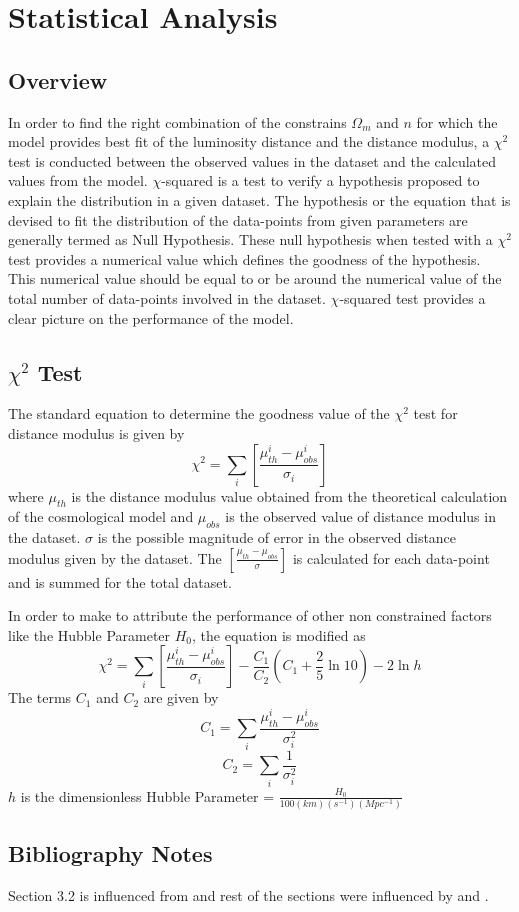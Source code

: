 
\chapter{Statistical Analysis}
\label{sec:3}
\section{Overview}
In order to find the right combination of the constrains $\Omega_{m}$ and $n$ for which the model provides best fit of the luminosity distance and the distance modulus, a $\chi^{2}$ test is conducted between the observed values in the dataset and the calculated values from the model. $\chi$-squared is a test to verify a hypothesis proposed to explain the distribution in a given dataset. The hypothesis or the equation that is devised to fit the distribution of the data-points from given parameters are generally termed as Null Hypothesis. These null hypothesis when tested with a $\chi^{2}$ test provides a numerical value which defines the goodness of the hypothesis. This numerical value should be equal to or be around the numerical value of the total number of data-points involved in the dataset. $\chi$-squared test provides a clear picture on the performance of the model.   


\section{$\chi^2$ Test}
The standard equation to determine the goodness value of the $\chi^{2}$ test for distance modulus is given by
\begin{equation}
    \chi^{2} = \sum_{i}\left[\frac{\mu^{i}_{th}-\mu^{i}_{obs}}{\sigma_{i}}\right]
\end{equation}
where $\mu_{th}$ is the distance modulus value obtained from the theoretical calculation of the cosmological model and $\mu_{obs}$ is the observed value of distance modulus in the dataset. $\sigma$ is the possible magnitude of error in the observed distance modulus given by the dataset. The $\left[\frac{\mu_{th}-\mu_{obs}}{\sigma}\right]$ is calculated for each data-point and is summed for the total dataset.

In order to make to attribute the performance of other non constrained factors like the Hubble Parameter $H_0$, the equation is modified as
\begin{equation}
    \chi^{2} = \sum_{i}\left[\frac{\mu^{i}_{th}-\mu^{i}_{obs}}{\sigma_{i}}\right]-\frac{C_1}{C_2}{\left(C_1+\frac{2}{5}\ln{10}\right)}-2{\ln{h}}
\end{equation}
The terms $C_1$ and $C_2$ are given by
\begin{equation}
    C_1 = \sum_{i}\frac{\mu^{i}_{th}-\mu^{i}_{obs}}{\sigma_i^{2}}
\end{equation}
\begin{equation}
    C_2 = \sum_{i}\frac{1}{\sigma_i^{2}}
\end{equation}
$h$ is the dimensionless Hubble Parameter = $\frac{H_0}{100 (km)(s^{-1})(Mpc^{-1})}$


\section{Bibliography Notes}
Section 3.2 is influenced from \citep{bertibangalore} and rest of the sections were influenced by \citep{RevModPhys.70.1545} and \citep{nollert1999quasinormal}.